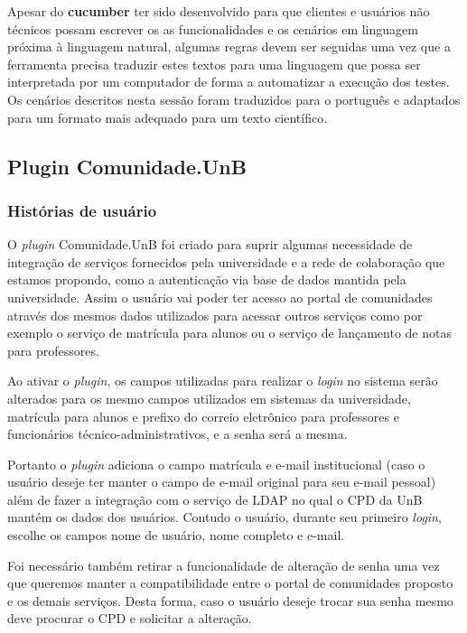Apesar do \textbf{cucumber} ter sido desenvolvido para que clientes e usuários
não técnicos possam escrever os as funcionalidades e os cenários em linguagem
próxima à linguagem natural, algumas regras devem ser seguidas uma vez que
a ferramenta precisa traduzir estes textos para uma linguagem que possa ser
interpretada por um computador de forma a automatizar a execução dos testes.
%
Os cenários descritos nesta sessão foram traduzidos para o português e
adaptados para um formato mais adequado para um texto científico.


\subsection{Plugin Comunidade.UnB}

\subsubsection*{Histórias de usuário}

O \textit{plugin} Comunidade.UnB foi criado para suprir algumas necessidade de
integração de serviços fornecidos pela universidade e a rede de colaboração que
estamos propondo, como a autenticação via base de dados mantida pela universidade.
%
Assim o usuário vai poder ter acesso ao portal de comunidades através dos mesmos
dados utilizados para acessar outros serviços como por exemplo o serviço de
matrícula para alunos ou o serviço de lançamento de notas para professores.

Ao ativar o \textit{plugin}, os campos utilizadas para realizar o \textit{login}
no sistema serão alterados para os mesmo campos utilizados em sistemas da
universidade, matrícula para alunos e prefixo do correio eletrônico para
professores e funcionários técnico-administrativos, e a senha será a mesma.

Portanto o \textit{plugin} adiciona o campo matrícula e e-mail institucional
(caso o usuário deseje ter manter o campo de e-mail original para seu e-mail
pessoal) além de fazer a integração com o serviço de LDAP no qual o CPD da UnB mantém
os dados dos usuários. Contudo o usuário, durante seu primeiro \textit{login},
escolhe os campos nome de usuário, nome completo e e-mail.

Foi necessário também retirar a funcionalidade de alteração de senha uma vez
que queremos manter a compatibilidade entre o portal de comunidades proposto
e os demais serviços. Desta forma, caso o usuário deseje trocar sua senha 
mesmo deve procurar o CPD e solicitar a alteração.

